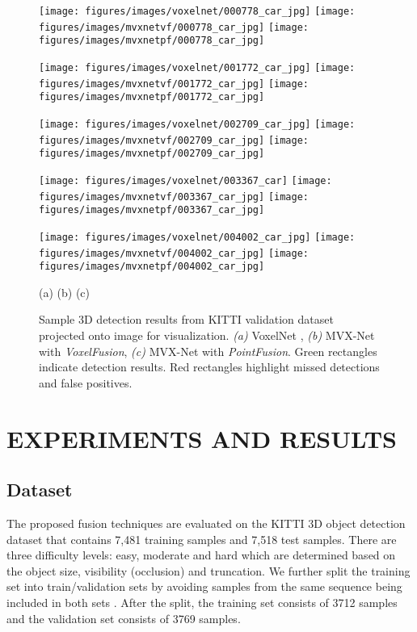 \documentclass[letterpaper, 10 pt, conference]{ieeeconf}
\begin{document}
\begin{figure*}[t!]
	\centering
	\texttt{[image: figures/images/voxelnet/000778\_car\_jpg]}
	\texttt{[image: figures/images/mvxnetvf/000778\_car\_jpg]}	
	\texttt{[image: figures/images/mvxnetpf/000778\_car\_jpg]}	
	
	\texttt{[image: figures/images/voxelnet/001772\_car\_jpg]}
	\texttt{[image: figures/images/mvxnetvf/001772\_car\_jpg]}	
	\texttt{[image: figures/images/mvxnetpf/001772\_car\_jpg]}	
	
	\texttt{[image: figures/images/voxelnet/002709\_car\_jpg]}
	\texttt{[image: figures/images/mvxnetvf/002709\_car\_jpg]}	
	\texttt{[image: figures/images/mvxnetpf/002709\_car\_jpg]}	
	
	\texttt{[image: figures/images/voxelnet/003367\_car]}
	\texttt{[image: figures/images/mvxnetvf/003367\_car\_jpg]}	
	\texttt{[image: figures/images/mvxnetpf/003367\_car\_jpg]}	
	
	\texttt{[image: figures/images/voxelnet/004002\_car\_jpg]}
	\texttt{[image: figures/images/mvxnetvf/004002\_car\_jpg]}	
	\texttt{[image: figures/images/mvxnetpf/004002\_car\_jpg]}	
	
(a)\hskip150pt (b)\hskip150pt (c)
	\vskip-0pt
	\caption{Sample 3D detection results from KITTI validation dataset projected onto image for visualization. \textit{(a)} VoxelNet \cite{REF:zhou2017voxelnet}, \textit{(b)} MVX-Net with \textit{VoxelFusion}, \textit{(c)} MVX-Net with \textit{PointFusion}. Green rectangles indicate detection results. Red rectangles highlight missed detections and false positives.}
	\label{fig:results_image}
\end{figure*}

\section{EXPERIMENTS AND RESULTS}
\label{sec:experiments}
\subsection{Dataset}
\label{ssec:Dataset}
The proposed fusion techniques are evaluated on the KITTI 3D object detection dataset \cite{REF:Geiger2012CVPR} that contains 7,481 training samples and 7,518 test samples. 
There are three difficulty levels: easy, moderate and hard which are determined based on the object size, visibility (occlusion) and truncation. We further split the training set into train/validation sets by avoiding samples from the same sequence being included in both sets \cite{REF:cvpr17chen}. After the split, the training set consists of 3712 samples and the validation set consists of 3769 samples. 
\end{document}

